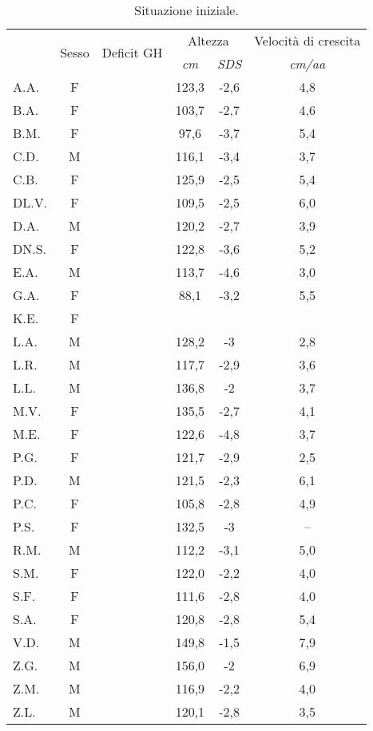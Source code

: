 \begin{table}[!h]
\begin{center}
\begin{tabular}{lccccc}
\toprule
 & \multirow{2}{*}{Sesso} & \multirow{2}{*}{Deficit GH} & \multicolumn{2}{c}{Altezza} & \multicolumn{1}{c}{Velocità di crescita} \\
 \cmidrule(r){4-5}
 & &   							& \emph{cm}      & \emph{SDS} & \emph{cm/aa}	 \\
\midrule
A.A.	& F &  				 		& 123,3 & -2,6 & 4,8 \\
B.A.	& F & \checkmark 	  			& 103,7 & -2,7 & 4,6  \\
B.M.	& F & \checkmark 	  			&  97,6 & -3,7 & 5,4 \\
C.D.	& M & \checkmark 	  			& 116,1 & -3,4 & 3,7 \\
C.B.	& F &  				 	        & 125,9 & -2,5 & 5,4 \\
DL.V.	& F & \checkmark 	  			& 109,5 & -2,5 & 6,0  \\
D.A.	& M &  				  		& 120,2 & -2,7 & 3,9 \\
DN.S.	& F & \checkmark 	  			& 122,8 & -3,6 & 5,2 \\
E.A.	& M &  				  		& 113,7 & -4,6 & 3,0 \\
G.A.	& F &  				  		&  88,1 & -3,2 & 5,5 \\
K.E.	& F &  				  		&       &      &     \\
L.A.	& M & \checkmark 	  			& 128,2 & -3   & 2,8 \\
L.R.	& M &  				  		& 117,7 & -2,9 & 3,6 \\
L.L.	& M &  				  		& 136,8 & -2   & 3,7  \\
M.V.	& F & \checkmark 	  			& 135,5 & -2,7 & 4,1 \\
M.E.	& F &  				  		& 122,6 & -4,8 & 3,7 \\
P.G.	& F & \checkmark 	  			& 121,7 & -2,9 & 2,5 \\
P.D.	& M &  				  		& 121,5 & -2,3 & 6,1 \\
P.C.	& F &  				  		& 105,8 & -2,8 & 4,9  \\
P.S.	& F &  				  		& 132,5 & -3   & --  \\
R.M.	& M & \checkmark 	  			& 112,2 & -3,1 & 5,0 \\
S.M.	& F & \checkmark 	  			& 122,0 & -2,2 & 4,0 \\
S.F.	& F &  				  		& 111,6 & -2,8 & 4,0 \\
S.A.	& F &  				  		& 120,8 & -2,8 & 5,4 \\
V.D.	& M &  				  		& 149,8 & -1,5 & 7,9 \\
Z.G.	& M &  				  		& 156,0 & -2   & 6,9  \\
Z.M.	& M &  				  		& 116,9 & -2,2 & 4,0 \\
Z.L.	& M &  				  		& 120,1 & -2,8 & 3,5 \\
\bottomrule
\end{tabular}
\end{center}
\caption{Situazione iniziale.}
\label{tab:SituazioneIniziale}
\end{table}


